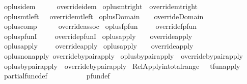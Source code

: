 \begin{isabellebody}
\ oplus{\isacharunderscore}idem\ \ \ \ \ {\isacharequal}\ override{\isacharunderscore}idem\isanewline
{}\isamarkupfalse%
\ oplus{\isacharunderscore}mt{\isacharunderscore}right\ {\isacharequal}\ override{\isacharunderscore}mt{\isacharunderscore}right\isanewline
{}\isamarkupfalse%
\ oplus{\isacharunderscore}mt{\isacharunderscore}left\ \ {\isacharequal}\ override{\isacharunderscore}mt{\isacharunderscore}left\isanewline
{}\isamarkupfalse%
\ oplus{\isacharunderscore}Domain\ \ \ {\isacharequal}\ override{\isacharunderscore}Domain\isanewline
{}\isamarkupfalse%
\ oplus{\isacharunderscore}comp\ \ \ \ \ {\isacharequal}\ override{\isacharunderscore}assoc\isanewline
{}\isamarkupfalse%
\ oplus{\isacharunderscore}fpfun\ \ \ \ {\isacharequal}\ override{\isacharunderscore}fpfun\isanewline
{}\isamarkupfalse%
\ oplus{\isacharunderscore}pfunI\ \ \ \ {\isacharequal}\ override{\isacharunderscore}pfunI\isanewline
\isanewline
\isanewline
{}\isamarkupfalse%
\ oplus{\isacharunderscore}apply{}\ \ \ {\isacharequal}\ override{\isacharunderscore}apply{}\isanewline
{}\isamarkupfalse%
\ oplus{\isacharunderscore}apply\ \ \ \ {\isacharequal}\ override{\isacharunderscore}apply\isanewline
\isanewline
{}\isamarkupfalse%
\ oplus{\isacharunderscore}apply{}\ \ \ {\isacharequal}\ override{\isacharunderscore}apply{}\ \isanewline
{}\isamarkupfalse%
\ oplus{\isacharunderscore}non{\isacharunderscore}apply{\isacharequal}\ override{\isacharunderscore}by{\isacharunderscore}pair{\isacharunderscore}apply{}\isanewline
{}\isamarkupfalse%
\ oplus{\isacharunderscore}by{\isacharunderscore}pair{\isacharunderscore}apply{}\ {\isacharequal}\ override{\isacharunderscore}by{\isacharunderscore}pair{\isacharunderscore}apply{}\isanewline
{}\isamarkupfalse%
\ oplus{\isacharunderscore}by{\isacharunderscore}pair{\isacharunderscore}apply{}\ {\isacharequal}\ override{\isacharunderscore}by{\isacharunderscore}pair{\isacharunderscore}apply{}\isanewline
\isanewline
{}\isamarkupfalse%
\ Rel{\isacharunderscore}Apply{\isacharunderscore}in{\isacharunderscore}total{\isacharunderscore}range\ \ {\isacharequal}\ tfun{\isacharunderscore}apply\isanewline
{}\isamarkupfalse%
\ partial{\isacharunderscore}func{\isacharunderscore}def\ \ \ \ \ \ \ \ \ \ {\isacharequal}\ pfun{\isacharunderscore}def\ \ \ \isanewline

\end{isabellebody}
